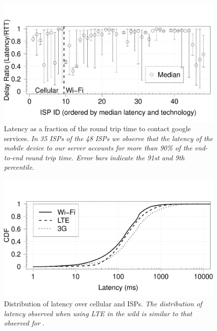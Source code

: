 \begin{figure}[t]
\includegraphics[width=\columnwidth]{plots/delay_ratio_isp_whisker.pdf}
\caption{Latency as a fraction of the round trip time to contact google services. \emph{In 35 ISPs of the 48 ISPs we observe that the latency of the mobile device to our server accounts for more than 90\% of the end-to-end round trip time. Error bars indicate the 91st and 9th percentile.}}
\label{fig:compare-delay-ratio}
\end{figure}

\begin{figure}[t]
\includegraphics[width=\columnwidth]{plots/distrib_latency_technology.pdf}
\caption{Distribution of latency over cellular and \wifi ISPs. \emph{The distribution of latency observed when using LTE in the wild is similar to that observed for \wifi}.}
\label{fig:compare-delay-ratio}
\end{figure}

